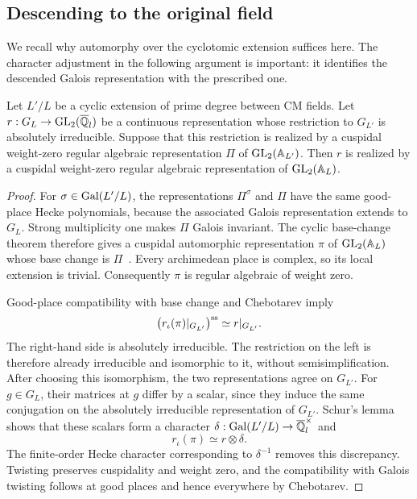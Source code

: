 \subsection{Descending to the original field}

We recall why automorphy over the cyclotomic extension suffices here.
The character adjustment in the following argument is important: it
identifies the descended Galois representation with the prescribed one.

\begin{lemma}\label{aut:descent}
Let $L'/L$ be a cyclic extension of prime degree between CM fields. Let
$r:G_L\to\operatorname{GL}_2(\overline{\mathbb Q}_l)$ be a continuous representation whose
restriction to $G_{L'}$ is absolutely irreducible. Suppose that this
restriction is realized by a cuspidal weight-zero regular algebraic
representation $\Pi$ of $\operatorname{GL}_2(\mathbb A_{L'})$. Then $r$ is realized by a
cuspidal weight-zero regular algebraic representation of $\operatorname{GL}_2(\mathbb A_L)$.
\end{lemma}
\begin{proof}
For $\sigma\in\operatorname{Gal}(L'/L)$, the representations $\Pi^\sigma$ and $\Pi$
have the same good-place Hecke polynomials, because the associated
Galois representation extends to $G_L$. Strong multiplicity one makes
$\Pi$ Galois invariant. The cyclic base-change theorem therefore gives
a cuspidal automorphic representation $\pi$ of $\operatorname{GL}_2(\mathbb A_L)$ whose
base change is $\Pi$~\cite{LanglandsBC,ArthurClozel}.
Every archimedean place is complex, so its local extension is trivial.
Consequently $\pi$ is regular algebraic of weight zero.

Good-place compatibility with base change and Chebotarev imply
\[
 \bigl(r_\iota(\pi)|_{G_{L'}}\bigr)^{\mathrm{ss}}
 \simeq r|_{G_{L'}}.
\]
The right-hand side is absolutely irreducible. The restriction on the
left is therefore already irreducible and isomorphic to it, without
semisimplification. After choosing this isomorphism, the two
representations agree on $G_{L'}$. For $g\in G_L$, their matrices at $g$
differ by a scalar, since they induce the same conjugation on the
absolutely irreducible representation of $G_{L'}$. Schur's lemma shows
that these scalars form a character
$\delta:\operatorname{Gal}(L'/L)\to\overline{\mathbb Q}_l^{\times}$ and
\[
 r_\iota(\pi)\simeq r\otimes\delta.
\]
The finite-order Hecke character corresponding to $\delta^{-1}$ removes
this discrepancy. Twisting preserves cuspidality and weight zero, and
the compatibility with Galois twisting follows at good places and hence
everywhere by Chebotarev.
\end{proof}

